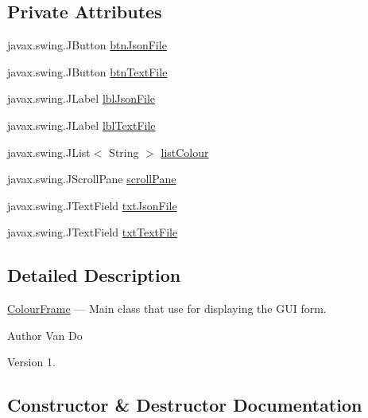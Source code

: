 \subsection*{Private Attributes}
\begin{DoxyCompactItemize}
\item 
javax.\+swing.\+J\+Button \hyperlink{classcolours_1_1_colour_frame_a1fe23149a50772dff538d0004e7cb1ee}{btn\+Json\+File}
\item 
javax.\+swing.\+J\+Button \hyperlink{classcolours_1_1_colour_frame_aeca940071b6ad635188894ab1be05658}{btn\+Text\+File}
\item 
javax.\+swing.\+J\+Label \hyperlink{classcolours_1_1_colour_frame_a3465e8e9a196ae2a3249b5212e954594}{lbl\+Json\+File}
\item 
javax.\+swing.\+J\+Label \hyperlink{classcolours_1_1_colour_frame_a89795e4433199461d0c29f8f2af8e35f}{lbl\+Text\+File}
\item 
javax.\+swing.\+J\+List$<$ String $>$ \hyperlink{classcolours_1_1_colour_frame_a9c6b0ac09f52427530bd1e0fbc285cc2}{list\+Colour}
\item 
javax.\+swing.\+J\+Scroll\+Pane \hyperlink{classcolours_1_1_colour_frame_a4101dbab121b9af67cb0ff9ef3c64a7a}{scroll\+Pane}
\item 
javax.\+swing.\+J\+Text\+Field \hyperlink{classcolours_1_1_colour_frame_adaffa1254ad772940748d49324e191a0}{txt\+Json\+File}
\item 
javax.\+swing.\+J\+Text\+Field \hyperlink{classcolours_1_1_colour_frame_a8acb908d5dbadca9e110960051340977}{txt\+Text\+File}
\end{DoxyCompactItemize}


\subsection{Detailed Description}
\hyperlink{classcolours_1_1_colour_frame}{Colour\+Frame} --- Main class that use for displaying the G\+UI form. \begin{DoxyAuthor}{Author}
Van Do 
\end{DoxyAuthor}
\begin{DoxyVersion}{Version}
1. 
\end{DoxyVersion}


\subsection{Constructor \& Destructor Documentation}
\mbox{\label{classcolours_1_1_colour_frame_ab7b3858b7fb97ff26bf7534c1767270c}} 

